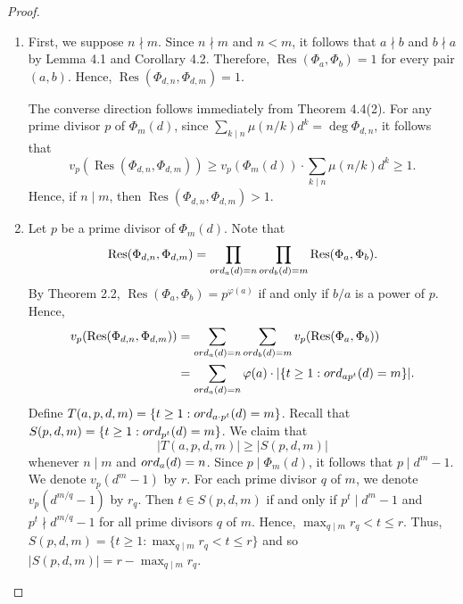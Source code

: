 \documentclass[10pt,a4paper]{amsart}
\def\ord{{\rm ord}}
\newcommand{\res}{\operatorname{Res}}
\begin{document}
\begin{proof}
    \begin{enumerate}
        \item First, we suppose $n\nmid m$. Since $n\nmid m$ and $n<m$, it follows that $a\nmid b$ and $b\nmid a$ by Lemma 4.1 and Corollary 4.2. Therefore, $\res(\Phi_a,\Phi_b) = 1$ for every pair $(a,b)$. Hence, $\res(\Phi_{d,n},\Phi_{d,m}) = 1$.

        The converse direction follows immediately from Theorem 4.4(2). For any prime divisor $p$ of $\Phi_m(d)$, since $\sum_{k\mid n}\mu(n/k)d^k = \deg\Phi_{d,n}$, it follows that
        $$v_p(\res(\Phi_{d,n},\Phi_{d,m})) \geq v_p(\Phi_m(d))\cdot\sum_{k\mid n}\mu(n/k)d^k\geq 1.$$
        Hence, if $n\mid m$, then $\res(\Phi_{d,n},\Phi_{d,m})>1$.
        \item Let $p$ be a prime divisor of $\Phi_m(d)$. Note that
        $$\res(\Phi_{d,n},\Phi_{d,m}) = \prod_{\ord_a(d) = n}\prod_{\ord_b(d) = m}\res(\Phi_a,\Phi_b).$$
        By Theorem 2.2, $\res(\Phi_a,\Phi_b) = p^{\varphi(a)}$ if and only if $b/a$ is a power of $p$. Hence,
        \begin{align}
            v_p(\res(\Phi_{d,n},\Phi_{d,m})) &= \sum_{\ord_{a}(d) = n}\sum_{\ord_b(d) = m}v_p(\res(\Phi_a,\Phi_b))\notag\\
            &= \sum_{\ord_a(d) = n}\varphi(a)\cdot |\{t\geq 1: \ord_{ap^t}(d) = m\}|.
        \end{align}
        Define $T(a,p,d,m) = \{t\geq 1:\ord_{a\cdot p^t}(d) = m\}$. Recall that $S(p,d,m) = \{t\geq 1:\ord_{p^t}(d) = m\}$. We claim that
        $$|T(a,p,d,m)|\geq |S(p,d,m)|$$
        whenever $n\mid m$ and $\ord_a(d) = n$. Since $p\mid \Phi_m(d)$, it follows that $p\mid d^m-1$. We denote $v_p(d^m-1)$ by $r$. For each prime divisor $q$ of $m$, we denote $v_p(d^{m/q}-1)$ by $r_q$. Then $t\in S(p,d,m)$ if and only if $p^t\mid d^m-1$ and $p^t\nmid d^{m/q}-1$ for all prime divisors $q$ of $m$. Hence, $\max_{q\mid m}r_q<t\leq r$. Thus, $S(p,d,m) = \{t\geq 1:\max_{q\mid m}r_q<t\leq r\}$ and so $|S(p,d,m)| = r-\max_{q\mid m}r_q$.


\end{enumerate}
\end{proof}
\end{document}
